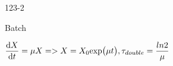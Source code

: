 \begin{mitframe}{123-2}
    
\begin{listone}
	\item Batch
    \item $\dfrac{\mathrm{d}X}{\mathrm{d}\timet}=\chempot{X}=> X=X_{\init}\text{exp}\big(\chempot\timet\big),\torque_{double}=\dfrac{ln2}{\chempot}$
\end{listone}  
\end{mitframe}